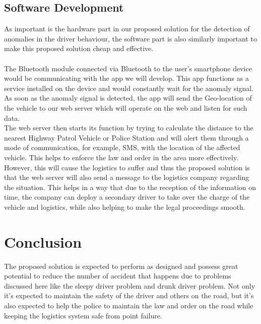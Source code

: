 \documentclass[12pt]{article}
\begin{document}
\subsection{Software Development}
As important is the hardware part in our proposed solution for the detection of anomalies in the driver behaviour, the software part is also similarly important to make this proposed solution cheap and effective. \\ \\ 
The Bluetooth module connected via Bluetooth to the user's smartphone device would be communicating with the app we will develop. This app functions as a service installed on the device and would constantly wait for the anomaly signal. As soon as the anomaly signal is detected, the app will send the Geo-location of the vehicle to our web server which will operate on the web and listen for such data. \\

The web server then starts its function by trying to calculate the distance to the nearest Highway Patrol Vehicle or Police Station and will alert them through a mode of communication, for example, SMS, with the location of the affected vehicle. This helps to enforce the law and order in the area more effectively. \\

However, this will cause the logistics to suffer and thus the proposed solution is that the web server will also send a message to the logistics company regarding the situation. This helps in a way that due to the reception of the information on time, the company can deploy a secondary driver to take over the charge of the vehicle and logistics, while also helping to make the legal proceedings smooth. 



\section{Conclusion}
The proposed solution is expected to perform as designed and possess great potential to reduce the number of accident that happens due to problems discussed here like the sleepy driver problem and drunk driver problem. Not only it's expected to maintain the safety of the driver and others on the road, but it's also expected to help the police to maintain the law and order on the road while keeping the logistics system safe from point failure. 


\end{document}

